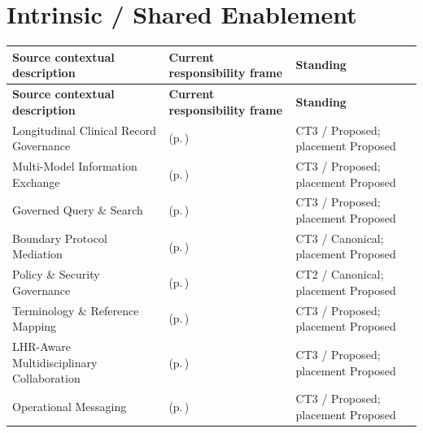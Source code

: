 \section{Intrinsic / Shared Enablement}
\begingroup\small\setlength{\TableWidth}{\dimexpr\linewidth-6\tabcolsep-4\arrayrulewidth\relax}
\begin{longtable}{|>{\raggedright\arraybackslash}p{0.37\TableWidth}|>{\raggedright\arraybackslash}p{0.4\TableWidth}|>{\raggedright\arraybackslash}p{0.23\TableWidth}|}
\hline\rowcolor{TableHead}\textbf{Source contextual description} & \textbf{Current responsibility frame} & \textbf{Standing}\\\hline\endfirsthead
\hline\rowcolor{TableHead}\textbf{Source contextual description} & \textbf{Current responsibility frame} & \textbf{Standing}\\\hline\endhead
\hline\endfoot
Longitudinal Clinical Record Governance & \nameref{cap:bec-reviewed-longitudinal-clinical-record-administration} (p.\,\pageref{cap:bec-reviewed-longitudinal-clinical-record-administration}) & CT3 / Proposed; placement Proposed\\\hline
Multi-Model Information Exchange & \nameref{cap:bec-reviewed-hie-implementation-management} (p.\,\pageref{cap:bec-reviewed-hie-implementation-management}) & CT3 / Proposed; placement Proposed\\\hline
Governed Query \& Search & \nameref{cap:bec-reviewed-governed-health-information-retrieval} (p.\,\pageref{cap:bec-reviewed-governed-health-information-retrieval}) & CT3 / Proposed; placement Proposed\\\hline
Boundary Protocol Mediation & \nameref{cap:bec-health-information-communication} (p.\,\pageref{cap:bec-health-information-communication}) & CT3 / Canonical; placement Proposed\\\hline
Policy \& Security Governance & \nameref{cap:bec-health-information-control} (p.\,\pageref{cap:bec-health-information-control}) & CT2 / Canonical; placement Proposed\\\hline
Terminology \& Reference Mapping & \nameref{cap:bec-governed-reference-dataset-administration} (p.\,\pageref{cap:bec-governed-reference-dataset-administration}) & CT3 / Proposed; placement Proposed\\\hline
LHR-Aware Multidisciplinary Collaboration & \nameref{cap:bec-reviewed-clinical-context-collaboration} (p.\,\pageref{cap:bec-reviewed-clinical-context-collaboration}) & CT3 / Proposed; placement Proposed\\\hline
Operational Messaging & \nameref{cap:bec-reviewed-operational-collaboration} (p.\,\pageref{cap:bec-reviewed-operational-collaboration}) & CT3 / Proposed; placement Proposed\\\hline

\end{longtable}
